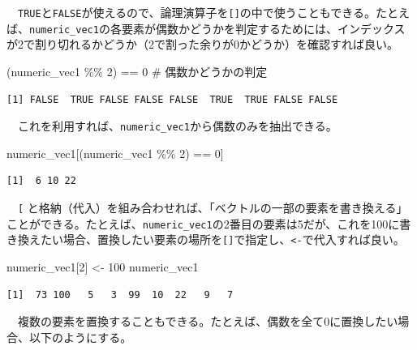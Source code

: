 \documentclass[
  a4paper,
  pandoc,
  ja=standard,
  jafont=haranoaji]{bxjsbook}
\newenvironment{Shaded}{\begin{snugshade}}{\end{snugshade}}
\newcommand{\CommentTok}[1]{\textcolor[rgb]{0.37,0.37,0.37}{#1}}
\newcommand{\DecValTok}[1]{\textcolor[rgb]{0.68,0.00,0.00}{#1}}
\newcommand{\NormalTok}[1]{\textcolor[rgb]{0.00,0.48,0.65}{#1}}
\newcommand{\OtherTok}[1]{\textcolor[rgb]{0.00,0.48,0.65}{#1}}
\newcommand{\SpecialCharTok}[1]{\textcolor[rgb]{0.37,0.37,0.37}{#1}}
\begin{document}
　\texttt{TRUE}と\texttt{FALSE}が使えるので、論理演算子を\texttt{{[}{]}}の中で使うこともできる。たとえば、\texttt{numeric\_vec1}の各要素が偶数かどうかを判定するためには、インデックスが2で割り切れるかどうか（2で割った余りが0かどうか）を確認すれば良い。

\begin{Shaded}
\begin{Highlighting}[numbers=left,,]
\NormalTok{(numeric\_vec1 }\SpecialCharTok{\%\%} \DecValTok{2}\NormalTok{) }\SpecialCharTok{==} \DecValTok{0}  \CommentTok{\# 偶数かどうかの判定}
\end{Highlighting}
\end{Shaded}

\begin{verbatim}
[1] FALSE  TRUE FALSE FALSE FALSE  TRUE  TRUE FALSE FALSE
\end{verbatim}

　これを利用すれば、\texttt{numeric\_vec1}から偶数のみを抽出できる。

\begin{Shaded}
\begin{Highlighting}[numbers=left,,]
\NormalTok{numeric\_vec1[(numeric\_vec1 }\SpecialCharTok{\%\%} \DecValTok{2}\NormalTok{) }\SpecialCharTok{==} \DecValTok{0}\NormalTok{]}
\end{Highlighting}
\end{Shaded}

\begin{verbatim}
[1]  6 10 22
\end{verbatim}

　\texttt{{[}}
と格納（代入）を組み合わせれば、「ベクトルの一部の要素を書き換える」ことができる。たとえば、\texttt{numeric\_vec1}の2番目の要素は5だが、これを100に書き換えたい場合、置換したい要素の場所を\texttt{{[}{]}}で指定し、\texttt{\textless{}-}で代入すれば良い。

\begin{Shaded}
\begin{Highlighting}[numbers=left,,]
\NormalTok{numeric\_vec1[}\DecValTok{2}\NormalTok{] }\OtherTok{\textless{}{-}} \DecValTok{100}
\NormalTok{numeric\_vec1}
\end{Highlighting}
\end{Shaded}

\begin{verbatim}
[1]  73 100   5   3  99  10  22   9   7
\end{verbatim}

　複数の要素を置換することもできる。たとえば、偶数を全て0に置換したい場合、以下のようにする。
\end{document}
